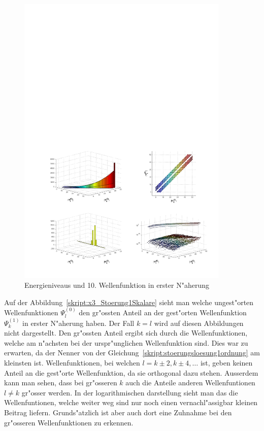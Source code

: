 \begin{refsection}
\begin{figure}[h]	%
\centering
\includegraphics[width=0.9\textwidth]{anharmonisch/images/x3/Stoerung2Skalare.pdf}
\caption{Energieniveaus und 10. Wellenfunktion in erster N"aherung
\label{skript:x3_Stoerung2Skalare}}
\end{figure}

Auf der Abbildung~\ref{skript:x3_Stoerung1Skalare} sieht man welche ungest"orten Wellenfunktionen $\Psi_l^{(0)}$ den gr"ossten Anteil an der gest"orten Wellenfunktion $\Psi_k^{(1)}$ in erster N"aherung haben. Der Fall $k=l$ wird auf diesen Abbildungen nicht dargestellt. Den gr"ossten Anteil ergibt sich durch die Wellenfunktionen, welche am n"achsten bei der urspr"unglichen Wellenfunktion sind. Dies war zu erwarten, da der Nenner von der Gleichung~\ref{skript:stoerungsloesung1ordnung} am kleinsten ist. Wellenfunktionen, bei welchen $l=k\pm 2,k\pm 4,\dots$ ist, geben keinen Anteil an die gest"orte Wellenfunktion, da sie orthogonal dazu stehen. Ausserdem kann man sehen, dass bei gr"osseren $k$ auch die Anteile anderen Wellenfuntionen $l\neq k$ gr"osser werden. In der logarithmischen darstellung sieht man das die Wellenfuntionen, welche weiter weg sind nur noch einen vernachl"assigbar kleinen Beitrag liefern. Grunds"atzlich ist aber auch dort eine Zuhnahme bei den gr"osseren Wellenfunktionen zu erkennen.


\end{refsection}
